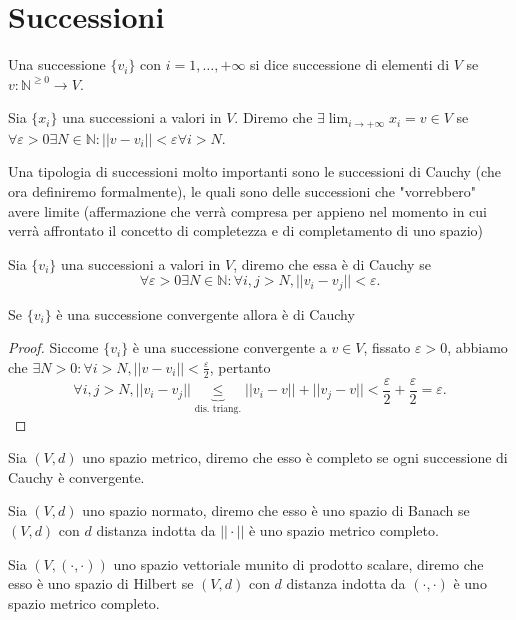 \documentclass[12pt, twoside, italian, openany]{book}
\begin{document}
	\section{Successioni}
	Una successione $\{ v_i \}$ con $i=1, \ldots, +\infty$ si dice successione di elementi di $V$ se $v : \mathbb{N}^{\geq 0} \to V$.
	\begin{definition}
		Sia $\{ x_i \}$ una successioni a valori in $V$. Diremo che $\exists \lim_{i \to +\infty} x_i = v \in V$ se $\forall \varepsilon > 0 \exists N \in \mathbb{N}: ||v - v_i|| < \varepsilon \forall i > N$.
	\end{definition}
	Una tipologia di successioni molto importanti sono le successioni di Cauchy (che ora definiremo formalmente), le quali sono delle successioni che "vorrebbero" avere limite (affermazione che verrà compresa per appieno nel momento in cui verrà affrontato il concetto di completezza e di completamento di uno spazio)
	\begin{definition}
		Sia $\{ v_i \}$ una successioni a valori in $V$, diremo che essa è di Cauchy se
		$$
		\forall \varepsilon > 0 \exists N \in \mathbb{N}: \forall i, j > N, ||v_i - v_j || < \varepsilon.
		$$
	\end{definition}
	\begin{prop}
		Se $\{ v_i \}$ è una successione convergente allora è di Cauchy
	\end{prop}
	\begin{proof}
		Siccome $\{ v_i \}$ è una successione convergente a $v \in V$, fissato $\varepsilon > 0$, abbiamo che $\exists N > 0: \forall i > N, ||v - v_i||<\frac{\varepsilon}{2}$, pertanto
		$$
		\forall i, j > N, || v_i - v_j || \underbrace{\leq}_{\text{dis. triang.}} ||v_i - v || + || v_j - v || < \frac{\varepsilon}{2} + \frac{\varepsilon}{2} = \varepsilon.
		$$
	\end{proof}
	\begin{definition}[completezza]
		Sia $(V, d)$ uno spazio metrico, diremo che esso è completo se ogni successione di Cauchy è convergente.
	\end{definition}
	\begin{definition}
		Sia $(V, d)$ uno spazio normato, diremo che esso è uno spazio di Banach se $(V, d)$ con $d$ distanza indotta da $||\cdot||$ è uno spazio metrico completo.
	\end{definition}
	\begin{definition}
		Sia $(V, (\cdot, \cdot))$ uno spazio vettoriale munito di prodotto scalare, diremo che esso è uno spazio di Hilbert se $(V, d)$ con $d$ distanza indotta da $(\cdot, \cdot)$ è uno spazio metrico completo.
	\end{definition}
\end{document}
